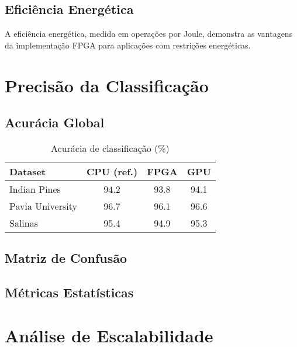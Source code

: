 \subsection{Eficiência Energética}
A eficiência energética, medida em operações por Joule, demonstra as vantagens da implementação FPGA para aplicações com restrições energéticas.

\section{Precisão da Classificação}\label{sec:precisao_classificacao}

\subsection{Acurácia Global}
\begin{table}[!htp]
\caption{Acurácia de classificação (\%)}
\label{tab:acuracia_classificacao}
\begin{center}
\begin{tabular}{lccc}
\toprule
\textbf{Dataset} & \textbf{CPU (ref.)} & \textbf{FPGA} & \textbf{GPU} \\
\midrule
Indian Pines & 94.2 & 93.8 & 94.1 \\
Pavia University & 96.7 & 96.1 & 96.6 \\
Salinas & 95.4 & 94.9 & 95.3 \\
\bottomrule
\end{tabular}
\end{center}
\end{table}

\subsection{Matriz de Confusão}

\subsection{Métricas Estatísticas}

\section{Análise de Escalabilidade}\label{sec:escalabilidade}

